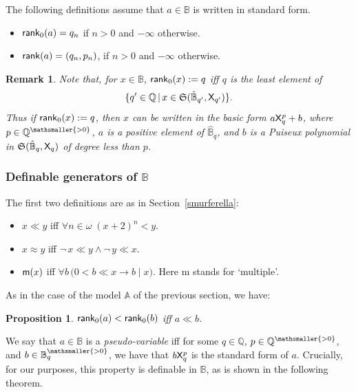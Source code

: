 \documentclass{amsart}
\newtheorem{prop}[theorem]{Proposition}
\newtheorem{rem}[theorem]{Remark}
\newcommand{\bin}{\mathbin{\in}}
\newcommand{\X}{{\sf X}}
\newcommand{\QS}{\mathbb{B}}
\newcommand{\m}{{\sf m}}
\newcommand{\shef}{\mathfrak{S}}
\begin{document}
The following definitions assume that $a\in \mathbb{B}$ is written in standard form.  
\begin{itemize}
    \item ${\sf rank}_0(a) = q_n$ if $n>0$ and $-\infty$ otherwise.
\item  ${\sf rank }(a) = (q_n,p_n)$, if $n>0$ and $-\infty$ otherwise.
\end{itemize}

\begin{rem}
Note that, for $x\in\mathbb{B}$, ${\sf rank}_0(x) := q$ iff $q$ is the least element of $$\{q'\in \mathbb{Q}  \mathop\mid x\in \shef(\hat{\mathbb{B}}_{q'},\X_{q'})\}.$$  Thus if ${\sf rank}_0(x) := q$, then $x$ can be written in the basic form $a\X_q^p+b$, where $p\in\mathbb{Q}^{\mathsmaller{> 0}}$, $a$ is a positive element of $\hat{\mathbb{B}}_{q}$, and $b$ is a Puiseux polynomial in $\shef(\hat{\mathbb{B}}_q, \X_q)$ of degree less than $p$. 
\end{rem}


\subsubsection{Definable generators of $\QS$}
The first two definitions are as in Section~\ref{smurferella}: 

\begin{itemize} 
    \item $x\ll y$ iff $\forall n\bin\omega\; (x+2)^n<y$.
    \item $x\approx y$ iff $\neg\, x\ll y \wedge \neg\, y \ll x$.\\
    \item $\m(x)$ iff  $\forall b\, \bigl(0<b\ll x\rightarrow b\mathop\mid x\bigr)$.
Here {\sf m} stands for `multiple'.
\end{itemize}
As in the case of the model $\mathbb{A}$ of the previous section, we have:
\begin{prop}
  ${\sf rank}_0(a)<{\sf rank}_0(b)$ iff $a\ll b$.  
\end{prop}

We say that $a\in \QS$ is a \textit{pseudo-variable} iff for some $q\in \mathbb{Q}$, $p\in\mathbb{Q}^{\mathsmaller{> 0}}$, and $b\in \QS_q^{\mathsmaller{> 0}}$, we have that
$b\X_q^p$ is the standard form of $a$. Crucially, for our purposes, this property is definable in $\QS$, as is shown in
the following theorem.
\end{document}
